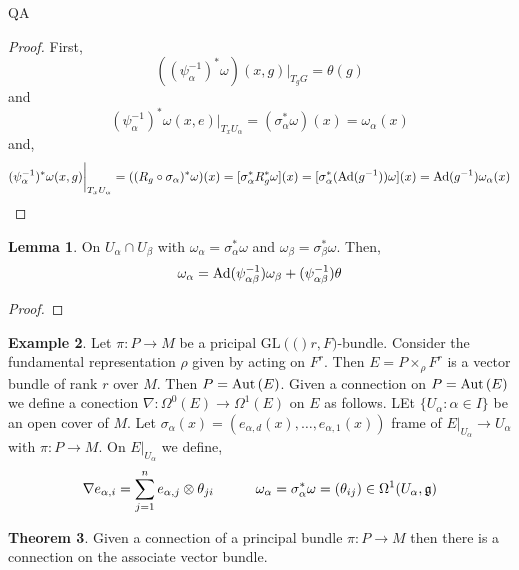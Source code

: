 QA	 \documentclass[12pt]{extarticle}
\theoremstyle{definition}
\newtheorem{theorem}{Theorem}[section]
\newtheorem{lemma}[theorem]{Lemma}
\newtheorem{example}[theorem]{Example}
\newcommand{\GL}[1]{\mathrm{GL}\left(#1\right)}
\begin{document}
\begin{proof}
First,
\[ ((\psi_\alpha^{-1})^* \omega)(x,g) \bigg|_{T_g G} = \theta(g) \]
and
\[ (\psi^{-1}_\alpha)^* \omega(x,e) \bigg|_{T_x U_\alpha} = (\sigma_\alpha^* \omega)(x) = \omega_\alpha(x) \]
and,
\[ (\psi_\alpha^{-1})^* \omega(x, g) \bigg|_{T_x U_\alpha} = ((R_g \circ \sigma_\alpha)^* \omega)(x) = [\sigma_\alpha^* R_g^* \omega](x) = [\sigma_\alpha^*(\mathrm{Ad}{(g^{-1})}) \omega](x) = \mathrm{Ad}{(g^{-1})} \omega_\alpha(x) \]
\end{proof}

\begin{lemma}
On $U_\alpha \cap U_\beta$ with $\omega_\alpha = \sigma_\alpha^* \omega$ and $\omega_\beta = \sigma_\beta^* \omega$. Then,
\[ \omega_\alpha = \mathrm{Ad}{(\psi^{-1}_{\alpha \beta})} \omega_\beta + (\psi^{-1}_{\alpha \beta}) \theta \]
\end{lemma}

\begin{proof}

\end{proof}

\begin{example}
Let $\pi : P \to M$ be a pricipal $\GL(r, F)$-bundle. Consider the fundamental representation $\rho$ given by acting on $F^r$. Then $E = P \times_\rho F^r$ is a vector bundle of rank $r$ over $M$. Then $P = \mathrm{Aut}\left( E \right)$. Given a connection on $P = \mathrm{Aut}\left( E \right)$ we define a conection $\nabla : \Omega^0(E) \to \Omega^1(E)$ on $E$ as follows. LEt $\{ U_\alpha : \alpha \in I \}$ be an open cover of $M$. Let $\sigma_\alpha(x) = (e_{\alpha, d}(x), \dots, e_{\alpha, 1}(x))$ frame of $E|_{U_\alpha} \to U_\alpha$ with $\pi : P \to M$. On $E|_{U_\alpha}$ we define,
\[ \nabla e_{\alpha,i} = \sum_{j = 1}^n e_{\alpha, j} \otimes \theta_{ji} \quad \quad \quad \omega_\alpha = \sigma_\alpha^* \omega = (\theta_{ij}) \in \Omega^1(U_\alpha, \mathfrak{g}) \] 
\end{example}

\begin{theorem}
Given a connection of a principal bundle $\pi : P \to M$ then there is a connection on the associate vector bundle. 
\end{theorem}
\end{document}
